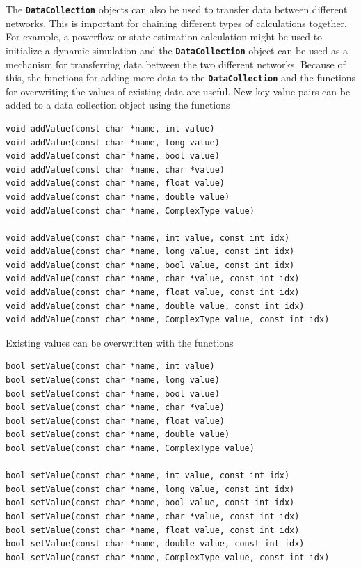 The \texttt{\textbf{DataCollection}} objects can also be used to transfer data between different networks. This is important for chaining different types of calculations together. For example, a powerflow or state estimation calculation might be used to initialize a dynamic simulation and the \texttt{\textbf{DataCollection}} object can be used as a mechanism for transferring data between the two different networks. Because of this, the functions for adding more data to the \texttt{\textbf{DataCollection}} and the functions for overwriting the values of existing data are useful. New key value pairs can be added to a data collection object using the functions

{
\color{red}
\begin{Verbatim}[fontseries=b]
void addValue(const char *name, int value)
void addValue(const char *name, long value)
void addValue(const char *name, bool value)
void addValue(const char *name, char *value)
void addValue(const char *name, float value)
void addValue(const char *name, double value)
void addValue(const char *name, ComplexType value)

void addValue(const char *name, int value, const int idx)
void addValue(const char *name, long value, const int idx)
void addValue(const char *name, bool value, const int idx)
void addValue(const char *name, char *value, const int idx)
void addValue(const char *name, float value, const int idx)
void addValue(const char *name, double value, const int idx)
void addValue(const char *name, ComplexType value, const int idx)
\end{Verbatim}
}

Existing values can be overwritten with the functions

{
\color{red}
\begin{Verbatim}[fontseries=b]
bool setValue(const char *name, int value)
bool setValue(const char *name, long value)
bool setValue(const char *name, bool value)
bool setValue(const char *name, char *value)
bool setValue(const char *name, float value)
bool setValue(const char *name, double value)
bool setValue(const char *name, ComplexType value)

bool setValue(const char *name, int value, const int idx)
bool setValue(const char *name, long value, const int idx)
bool setValue(const char *name, bool value, const int idx)
bool setValue(const char *name, char *value, const int idx)
bool setValue(const char *name, float value, const int idx)
bool setValue(const char *name, double value, const int idx)
bool setValue(const char *name, ComplexType value, const int idx)
\end{Verbatim}
}
